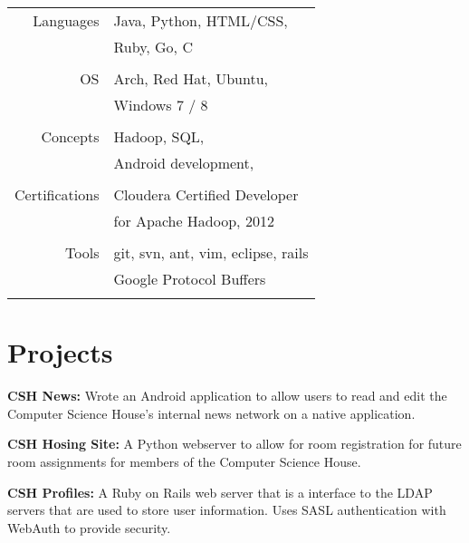 \documentclass[10pt]{article} %
\begin{document}
{\begin{minipage}[t]{0.44\textwidth}
\begin{tabular}{rl}
Languages
& Java, Python, HTML/CSS, \\ 
& Ruby, Go, C \\ 
& \\
OS
& Arch, Red Hat, Ubuntu, \\
& Windows 7 / 8 \\
& \\
Concepts
& Hadoop, SQL, \\
& Android development, \\
& \\
Certifications
& Cloudera Certified Developer \\
& for Apache Hadoop, 2012 \\
& \\
Tools
& git, svn, ant, vim, eclipse, rails \\
& Google Protocol Buffers \\
& \\
\end{tabular}


\section{Projects}
    \begin{sloppypar}
        {\bf CSH News:} Wrote an Android application to allow users to read and edit the Computer Science House's internal news network on a native application. \\
    \end{sloppypar} 
    \begin{sloppypar}
        {\bf CSH Hosing Site:} A Python webserver to allow for room registration for future room assignments for members of the Computer Science House.\\
    \end{sloppypar}
    \begin{sloppypar}
        {\bf CSH Profiles:} A Ruby on Rails web server that is a interface to the LDAP servers that are used to store user information. Uses  SASL authentication with WebAuth to provide security. \\
    \end{sloppypar}
    


\end{minipage}}
\end{document}
